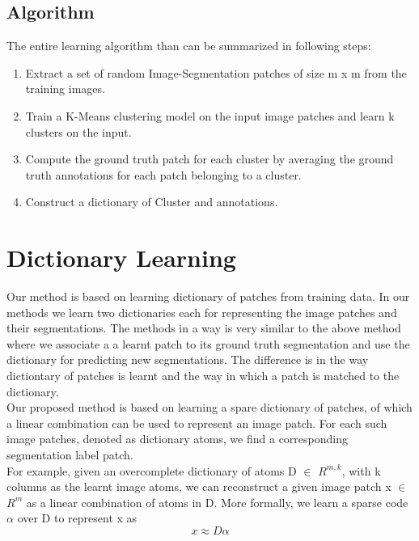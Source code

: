 \subsection{Algorithm}
The entire learning algorithm than can be summarized in following steps:
\begin{enumerate}
\item Extract a set of random Image-Segmentation patches of size m x m from the training images.

\item Train a K-Means clustering model on the input image patches and learn k clusters on the input.

\item Compute the ground truth patch for each cluster by averaging the ground truth annotations for each patch belonging to a cluster. 

\item Construct a dictionary of Cluster and annotations.
\end{enumerate}



\section{Dictionary Learning}

Our method is based on learning dictionary of patches from training data. In our methods we learn two dictionaries each for representing the image patches and their segmentations. The methods in a way is very similar to the above method where we associate a a learnt patch to its ground truth segmentation and use the dictionary for predicting new segmentations. The difference is in the way dictiontary of patches is learnt and the way in which a patch is matched to the dictionary. \\

Our proposed method is based on learning a spare dictionary of patches, of which a linear combination can be used to represent an image patch.
For each such image patches, denoted as dictionary atoms, we find a corresponding segmentation label patch.\\

For example, given an overcomplete dictionary of atoms D $\in$ $R^{m,k}$, with k columns as the learnt image atoms, we can reconstruct a given image patch x $\in$ $R^m$ as a linear combination of atoms in D. More formally, we learn a sparse code $\alpha$ over D to represent x as
$$ x \approx D \alpha $$  

